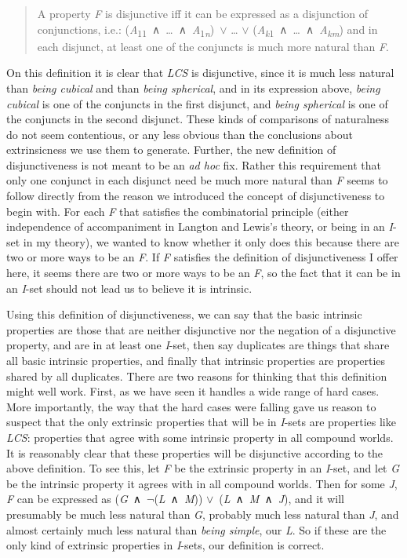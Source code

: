 \documentclass[
  11pt,
  letterpaper,
  DIV=11,
  numbers=noendperiod,
  twoside]{scrartcl}
\begin{document}
\begin{quote}
A property \emph{F} is disjunctive iff it can be expressed as a
disjunction of conjunctions, i.e.:
(\emph{A}\textsubscript{11}~∧~\ldots~∧~\emph{A}\textsubscript{1\emph{n}})~\({\vee}\)
\ldots{} \({\vee}\)
(\emph{A\textsubscript{k}}\textsubscript{1}~∧~\ldots~∧~\emph{A\textsubscript{km}})
and in each disjunct, at least one of the conjuncts is much more natural
than \emph{F}.
\end{quote}

On this definition it is clear that \emph{LCS} is disjunctive, since it
is much less natural than \emph{being cubical} and than \emph{being
spherical}, and in its expression above, \emph{being cubical} is one of
the conjuncts in the first disjunct, and \emph{being spherical} is one
of the conjuncts in the second disjunct. These kinds of comparisons of
naturalness do not seem contentious, or any less obvious than the
conclusions about extrinsicness we use them to generate. Further, the
new definition of disjunctiveness is not meant to be an \emph{ad hoc}
fix. Rather this requirement that only one conjunct in each disjunct
need be much more natural than \emph{F} seems to follow directly from
the reason we introduced the concept of disjunctiveness to begin with.
For each \emph{F} that satisfies the combinatorial principle (either
independence of accompaniment in Langton and Lewis's theory, or being in
an \emph{I}-set in my theory), we wanted to know whether it only does
this because there are two or more ways to be an \emph{F}. If \emph{F}
satisfies the definition of disjunctiveness I offer here, it seems there
are two or more ways to be an \emph{F}, so the fact that it can be in an
\emph{I}-set should not lead us to believe it is intrinsic.

Using this definition of disjunctiveness, we can say that the basic
intrinsic properties are those that are neither disjunctive nor the
negation of a disjunctive property, and are in at least one
\emph{I}-set, then say duplicates are things that share all basic
intrinsic properties, and finally that intrinsic properties are
properties shared by all duplicates. There are two reasons for thinking
that this definition might well work. First, as we have seen it handles
a wide range of hard cases. More importantly, the way that the hard
cases were falling gave us reason to suspect that the only extrinsic
properties that will be in \emph{I}-sets are properties like \emph{LCS}:
properties that agree with some intrinsic property in all compound
worlds. It is reasonably clear that these properties will be disjunctive
according to the above definition. To see this, let \emph{F} be the
extrinsic property in an \emph{I}-set, and let \emph{G} be the intrinsic
property it agrees with in all compound worlds. Then for some \emph{J},
\emph{F} can be expressed as
(\emph{G}~∧~\({\lnot}\)(\emph{L}~∧~\emph{M}))
\({\vee}\)~(\emph{L}~∧~\emph{M}~∧~\emph{J}), and it will presumably be
much less natural than \emph{G}, probably much less natural than
\emph{J}, and almost certainly much less natural than \emph{being
simple}, our \emph{L}. So if these are the only kind of extrinsic
properties in \emph{I}-sets, our definition is correct.
\end{document}
